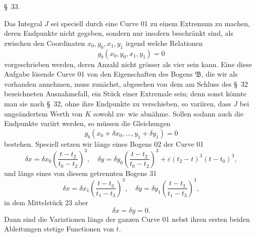 \documentclass[11pt,a4paper,leqno]{article}
\begin{document}
\begin{center}{\large \S~33.}\end{center}

Das Integral $J$ sei speciell durch eine Curve 01 zu einem Extremum zu machen, deren Endpunkte nicht gegeben, sondern nur insofern beschränkt sind, als zwischen den Coordinaten $x_0,y_0,x_1,y_1$ irgend welche Relationen
\[
g_b(x_0,y_0,x_1,y_1)=0
\]
vorgeschrieben werden, deren Anzahl nicht grösser als vier sein kann. Eine diese Aufgabe lösende Curve 01 von den Eigenschaften des Bogens $\mathfrak{B}$, die wir als vorhanden annehmen, muss zunächst, abgesehen von dem am Schluss des \S~32 bezeichneten Ausnahmefall, ein Stück einer Extremale sein; denn sonst könnte man sie nach \S~32, ohne ihre Endpunkte zu verschieben, so variiren, dass $J$ bei ungeändertem Werth von $K$ sowohl zu- wie abnähme. Sollen sodann auch die Endpunkte variirt werden, so müssen die Gleichungen
\begin{equation}\tag{3}
g_b(x_0+\delta x_0,\ldots,y_1+\delta y_1)=0
\end{equation}
bestehen. Speciell setzen wir längs eines Bogens 02 der Curve 01
\[
\delta x=\delta x_0\left(\frac{t-t_2}{t_0-t_2}\right)^3,
\quad
\delta y=\delta y_0\left(\frac{t-t_2}{t_0-t_2}\right)^3
+\varepsilon(t_2-t)^3(t-t_0)^3,
\]
und längs eines von diesem getrennten Bogens 31
\[
\delta x=\delta x_1\left(\frac{t-t_3}{t_1-t_3}\right)^3,
\quad
\delta y=\delta y_1\left(\frac{t-t_3}{t_1-t_3}\right)^3,
\]
in dem Mittelstück 23 aber
\[
\delta x=\delta y=0.
\]
Dann sind die Variationen längs der ganzen Curve 01 nebst ihren ersten beiden Ableitungen stetige Functionen von $t$.
\end{document}
